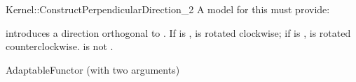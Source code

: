 \begin{ccRefFunctionObjectConcept}{Kernel::ConstructPerpendicularDirection_2}
A model for this must provide:


            {introduces a direction orthogonal to . If  is
             ,  is rotated clockwise; if  is
             ,  is rotated counterclockwise.
             \ccPrecond {} is not .}

\ccRefines
AdaptableFunctor (with two arguments)

\ccSeeAlso
{} \\

\end{ccRefFunctionObjectConcept}
